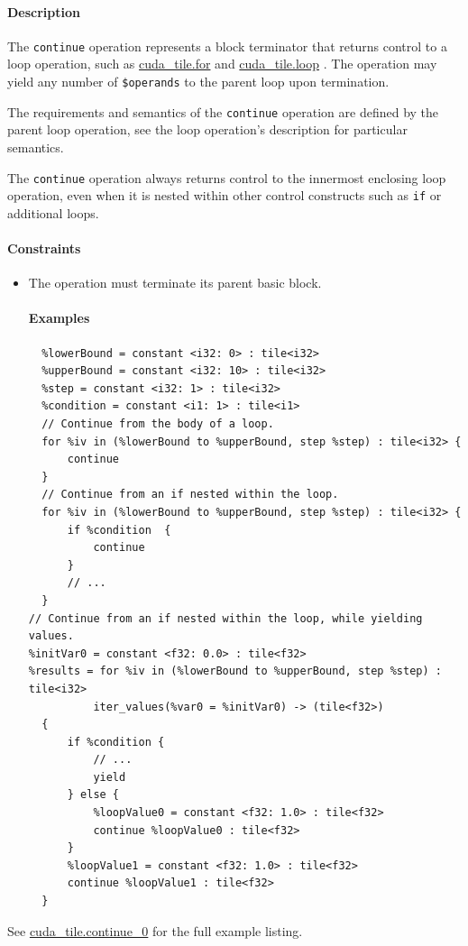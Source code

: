 \documentclass{article}
\begin{document}
\paragraph{Description}

The \texttt{continue} operation represents a block terminator that returns control to a loop operation, such as \href{https://docs.nvidia.com/cuda/tile-ir/latest/sections/operations.html#op-cuda-tile-for}{cuda\_tile.for} and \href{https://docs.nvidia.com/cuda/tile-ir/latest/sections/operations.html#op-cuda-tile-loop}{cuda\_tile.loop} . The operation may yield any number of \texttt{\$operands} to the parent loop upon termination.


The requirements and semantics of the \texttt{continue} operation are defined by the parent loop operation, see the loop operation's description for particular semantics.


The \texttt{continue} operation always returns control to the innermost enclosing loop operation, even when it is nested within other control constructs such as \texttt{if} or additional loops.



\paragraph{Constraints}

\begin{itemize}
\item The operation must terminate its parent basic block.


\paragraph{Examples}

\begin{lstlisting}
  %lowerBound = constant <i32: 0> : tile<i32>
  %upperBound = constant <i32: 10> : tile<i32>
  %step = constant <i32: 1> : tile<i32>
  %condition = constant <i1: 1> : tile<i1>
  // Continue from the body of a loop.
  for %iv in (%lowerBound to %upperBound, step %step) : tile<i32> {
      continue
  }
  // Continue from an if nested within the loop.
  for %iv in (%lowerBound to %upperBound, step %step) : tile<i32> {
      if %condition  {
          continue
      }
      // ...
  }
// Continue from an if nested within the loop, while yielding values.
%initVar0 = constant <f32: 0.0> : tile<f32>
%results = for %iv in (%lowerBound to %upperBound, step %step) : tile<i32>
          iter_values(%var0 = %initVar0) -> (tile<f32>)
  {
      if %condition {
          // ...
          yield
      } else {
          %loopValue0 = constant <f32: 1.0> : tile<f32>
          continue %loopValue0 : tile<f32>
      }
      %loopValue1 = constant <f32: 1.0> : tile<f32>
      continue %loopValue1 : tile<f32>
  }
\end{lstlisting}

\end{itemize}
See \href{https://docs.nvidia.com/cuda/tile-ir/latest/sections/appendix.html#example-cuda-tile-continue-0}{cuda\_tile.continue\_0} for the full example listing.
\end{document}
